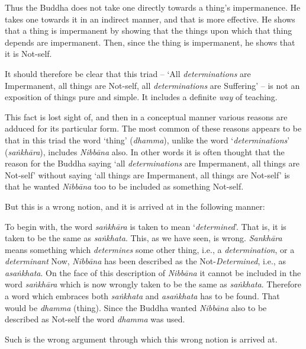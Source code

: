 Thus the Buddha does not take one directly towards a thing's impermanence. He takes one towards it in an indirect manner, and that is more effective. He shows that a thing is impermanent by showing that the things upon which that thing depends are impermanent. Then, since the thing is impermanent, he shows that it is Not-self.

It should therefore be clear that this triad -- `All \textit{determinations} are Impermanent, all things are Not-self, all \textit{determinations} are Suffering' -- is not an exposition of things pure and simple. It includes a definite \emph{way} of teaching.

This fact is lost sight of, and then in a conceptual manner various reasons are adduced for its particular form. The most common of these reasons appears to be that in this triad the word `thing' (\textit{dhamma}), unlike the word `\textit{determinations}' (\textit{saṅkhāra}), includes \textit{Nibbāna} also. In other words it is often thought that the reason for the Buddha saying `all \textit{determinations} are Impermanent, all things are Not-self' without saying `all things are Impermanent, all things are Not-self' is that he wanted \textit{Nibbāna} too to be included as something Not-self.

But this is a wrong notion, and it is arrived at in the following manner:

To begin with, the word \textit{saṅkhāra} is taken to mean `\textit{determined}'. That is, it is taken to be the same as \textit{saṅkhata}. This, as we have seen, is wrong. \textit{Sankhāra} means something which \textit{determines} some other thing, i.e., a \textit{determination}, or a \textit{determinant} Now, \textit{Nibbāna} has been described as the Not-\textit{Determined}, i.e., as \textit{asaṅkhata}. On the face of this description of \textit{Nibbāna} it cannot be included in the word \textit{saṅkhāra} which is now wrongly taken to be the same as \textit{saṅkhata}. Therefore a word which embraces both \textit{saṅkhata} and \textit{asaṅkhata} has to be found. That would be \textit{dhamma} (thing). Since the Buddha wanted \textit{Nibbāna} also to be described as Not-self the word \textit{dhamma} was used.

Such is the wrong argument through which this wrong notion is arrived at.

